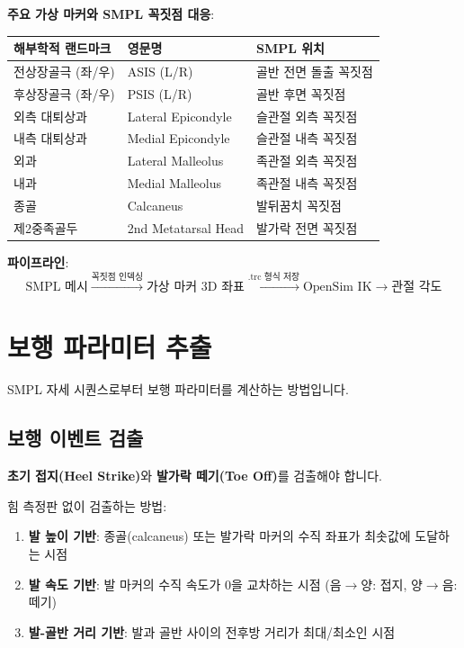 \documentclass[11pt, a4paper]{report}
\begin{document}
\textbf{주요 가상 마커와 SMPL 꼭짓점 대응}:

\begin{center}
\renewcommand{\arraystretch}{1.3}
\small
\begin{tabular}{lll}
\toprule
\textbf{해부학적 랜드마크} & \textbf{영문명} & \textbf{SMPL 위치} \\
\midrule
전상장골극 (좌/우) & ASIS (L/R) & 골반 전면 돌출 꼭짓점 \\
후상장골극 (좌/우) & PSIS (L/R) & 골반 후면 꼭짓점 \\
외측 대퇴상과 & Lateral Epicondyle & 슬관절 외측 꼭짓점 \\
내측 대퇴상과 & Medial Epicondyle & 슬관절 내측 꼭짓점 \\
외과 & Lateral Malleolus & 족관절 외측 꼭짓점 \\
내과 & Medial Malleolus & 족관절 내측 꼭짓점 \\
종골 & Calcaneus & 발뒤꿈치 꼭짓점 \\
제2중족골두 & 2nd Metatarsal Head & 발가락 전면 꼭짓점 \\
\bottomrule
\end{tabular}
\end{center}

\textbf{파이프라인}:
\begin{equation}
\text{SMPL 메시} \xrightarrow{\text{꼭짓점 인덱싱}} \text{가상 마커 3D 좌표} \xrightarrow{\text{.trc 형식 저장}} \text{OpenSim IK} \xrightarrow{} \text{관절 각도}
\end{equation}


\section{보행 파라미터 추출}
\label{sec:gait_param_extraction}

SMPL 자세 시퀀스로부터 보행 파라미터를 계산하는 방법입니다.

\subsection{보행 이벤트 검출}

\textbf{초기 접지(Heel Strike)}와 \textbf{발가락 떼기(Toe Off)}를 검출해야 합니다.

힘 측정판 없이 검출하는 방법:
\begin{enumerate}[leftmargin=*]
  \item \textbf{발 높이 기반}: 종골(calcaneus) 또는 발가락 마커의 수직 좌표가 최솟값에 도달하는 시점
  \item \textbf{발 속도 기반}: 발 마커의 수직 속도가 0을 교차하는 시점 (음$\rightarrow$양: 접지, 양$\rightarrow$음: 떼기)
  \item \textbf{발-골반 거리 기반}: 발과 골반 사이의 전후방 거리가 최대/최소인 시점
\end{enumerate}
\end{document}
